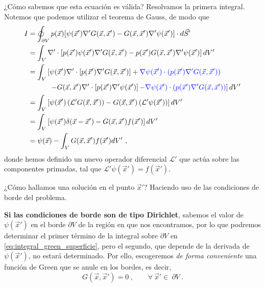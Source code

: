¿Cómo sabemos que esta ecuación es válida? Resolvamos la primera integral. Notemos que podemos utilizar el teorema de Gauss, de modo que
\begin{align}
    I & = \oint_{\partial V} p(\vec{x})[\psi(\vec{x}') \nabla' G(\vec{x}, \vec{x}') - G(\vec{x}, \vec{x}') \nabla' \psi(\vec{x}')] \cdot d\vec{S}' \label{eq:integral_green_superficie} \\
    & = \int_V \nabla' \cdot \left[ p(\vec{x}') \psi(\vec{x}') \nabla' G(\vec{x}, \vec{x}') - p(\vec{x}') G(\vec{x}, \vec{x}') \nabla' \psi(\vec{x}') \right] dV' \\
    & = \int_V \left[\psi(\vec{x}') \nabla' \cdot \left[ p(\vec{x}')  \nabla' G(\vec{x}, \vec{x}')\right] + \textcolor{blue}{\nabla \psi(\vec{x}') \cdot (p(\vec{x}') \nabla' G(\vec{x}, \vec{x}') )} \right. \nonumber \\
    & \qquad \quad \left. -  G(\vec{x}, \vec{x}') \nabla' \cdot \left[p(\vec{x}') \nabla' \psi(\vec{x}')\right] \textcolor{blue}{- \nabla \psi(\vec{x}') \cdot (p(\vec{x}') \nabla' G(\vec{x}, \vec{x}') )} \right] dV' \\
    & = \int_V \left[ \psi(\vec{x}') \left( \mathcal{L}' G(\vec{x}, \vec{x}') \right) - G(\vec{x}, \vec{x}') \left( \mathcal{L}' \psi(\vec{x}') \right) \right] dV' \\
    & = \int_V \left[ \psi(\vec{x}') \delta(\vec{x} - \vec{x}') - G(\vec{x}, \vec{x}') f(\vec{x}') \right] dV' \\
    & = \psi(\vec{x}) - \int_V G(\vec{x}, \vec{x}') f(\vec{x}') dV' \ ,
\end{align}
donde hemos definido un nuevo operador diferencial $\mathcal{L}'$ que actúa sobre las componentes primadas, tal que $\mathcal{L}' \psi(\vec{x}') = f(\vec{x}')$.

¿Cómo hallamos una solución en el punto $\vec{x}'$? Haciendo uso de las condiciones de borde del problema.

\textbf{Si las condiciones de borde son de tipo Dirichlet}, sabemos el valor de $\psi(\vec{x}')$ en el borde $\partial V$ de la región en que nos encontramos, por lo que podremos determinar el primer término de la integral sobre $\partial V$ en \eqref{eq:integral_green_superficie}, pero el segundo, que depende de la derivada de $\psi(\vec{x}')$, no estará determinado. Por ello, escogeremos \emph{de forma conveniente} una función de Green que se anule en los bordes, es decir,
\begin{equation}\label{eq:condicion_dirichlet_green}
    G(\vec{x}, \vec{x}') = 0 \ , \qquad \forall \ \vec{x}' \in \ \partial V \ .
\end{equation}

